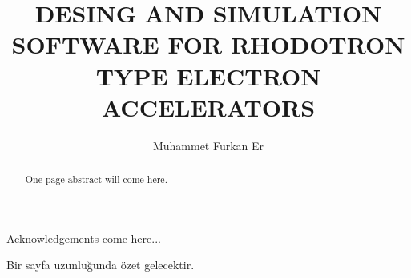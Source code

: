 \documentclass[a4paper,oneside,12pt]{report}
\title{DESING AND SIMULATION SOFTWARE FOR RHODOTRON TYPE ELECTRON ACCELERATORS}
\author{Muhammet Furkan Er}
\numberwithin{equation}{chapter}
\begin{document}
\makemstitle %
\makeapprovalpage

\begin{acknowledgements}
Acknowledgements come here...
\end{acknowledgements}

\begin{abstract}
One page abstract will come here.  
\end{abstract}

\begin{ozet}
Bir sayfa uzunluğunda özet gelecektir.
\end{ozet}

\tableofcontents
\listoffigures
\listoftables





\newcommand{\vecthreeBF}[1]{\vec{\textbf{#1}}}
\newcommand{\vecthree}[1]{\vec{#1}}
\newcommand{\vecNum}[3]{(#1, #2, #3)}

\newcommand{\parDeriv}[2]{\frac{\partial #1}{\partial #2}}
\newcommand{\parDerivS}[2]{\frac{\partial^2 #1}{\partial #2^2}}
\newcommand{\derivS}[2]{\frac{d^2 #1}{d#2^2}}

\newcommand{\dotProdBF}[2]{\vecthreeBF{#1} \cdot \vecthreeBF{#2}}
\newcommand{\dotProd}[2]{\vecthree{#1} \cdot \vecthree{#2}}

\newcommand{\crossProdBF}[2]{\vecthreeBF{#1} \times \vecthreeBF{#2}}
\newcommand{\crossProd}[2]{\vecthree{#1} \times \vecthree{#2}}

\newcommand{\e}{$\textbf{e}^-$ }
\newcommand{\egun}{$\textbf{e}^-$-gun }
\newcommand{\eB}{$\textbf{e}^-$ - $\vecthreeBF{B}$ }
\newcommand{\eE}{$\textbf{e}^-$ - $\vecthreeBF{E}$ }
\newcommand{\eEM}{$\textbf{e}^-$ - \textbf{EM} }
\newcommand{\ee}{$\textbf{e}^-$ - $\textbf{e}^-$ }


\newcommand{\fromeq}[1]{\textit{equation \ref{eq:#1}}}
\newcommand{\fromeqs}[2]{\textit{equations \ref{eq:#1} and \ref{eq:#2}}}
\newcommand{\fromeqsth}[3]{\textit{equations \ref{eq:#1}, \ref{eq:#2} and \ref{eq:#3}}}
\newcommand{\fromeqsf}[4]{\textit{equations \ref{eq:#1}, \ref{eq:#2}, \ref{eq:#3} and \ref{eq:#4}}}

\newcommand{\fromfig}[1]{\textit{figure \ref{fig:#1}}}
\newcommand{\fromfigs}[2]{\textit{figures \ref{fig:#1} and \ref{fig:#2}}}
\newcommand{\fromfigf}[4]{\textit{figures \ref{fig:#1}, \ref{fig:#2}, \ref{fig:#3} and \ref{fig:#4}}}
\newcommand{\fromfigsix}[6]{\textit{figures \ref{fig:#1}, \ref{fig:#2}, \ref{fig:#3}, \ref{fig:#4}, \ref{fig:#5} and \ref{fig:#6}}}

\newcommand{\fromsec}[1]{\textit{section \ref{sec:#1}}}
\newcommand{\fromsecs}[2]{\textit{sections \ref{sec:#1} and \ref{sec:#2}}}

\newcommand{\fromapp}[1]{\textit{Appendix \ref{appendix:#1}}}

\newcommand{\fromtab}[1]{\textit{Table \ref{tab:#1}}}
\newcommand{\fromtabs}[2]{\textit{Tables \ref{tab:#1} and \ref{tab:#2}}}
\newcommand{\fromtabf}[4]{\textit{Tables \ref{tab:#1}, \ref{tab:#2}, \ref{tab:#3} and \ref{tab:#4}}}
\end{document}
